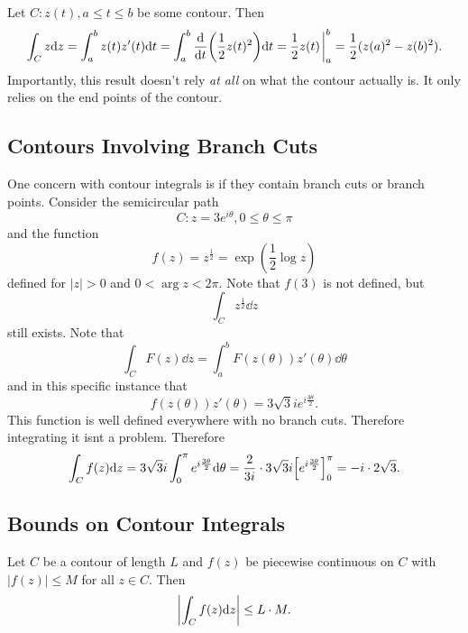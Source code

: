 \documentclass[../notes.tex]{subfiles}
\begin{document}
\begin{example}
    Let $C : z(t), a \leq t \leq b$ be some contour. Then
    \[
        \int_C z \dd z = \int_a^b z(t) z'(t) \dd t =  \int_a^b \dv{t} \qty(\frac{1}{2} z(t)^2) \dd t = \frac{1}{2} z(t) \eval_a^b = \frac{1}{2} (z(a)^2 - z(b)^2)
    .\]
    Importantly, this result doesn't rely \textit{at all} on what the contour actually is. It only relies on the end points of the contour.
\end{example}

\subsection{Contours Involving Branch Cuts}

One concern with contour integrals is if they contain branch cuts or branch points. Consider the semicircular path
\[
    C : z = 3 e^{i \theta}, 0 \leq \theta \leq \pi
\]
and the function
\[
    f(z) = z^{\frac{1}{2}} = \exp(\frac{1}{2} \log z)
\]
defined for $|z| > 0$ and $0 < \arg z < 2 \pi$. Note that $f(3)$ is not defined, but
\[
    \int_C z^{\frac{1}{2}} \dd z
\]
still exists. Note that
\[
    \int_C F(z) \dd z = \int_a^b F(z(\theta)) z'(\theta) \dd \theta
\]
and in this specific instance that
\[
    f(z(\theta)) z'(\theta) = 3 \sqrt{3} i e^{i \frac{3 \theta}{2}}
.\]
This function is well defined everywhere with no branch cuts. Therefore integrating it isnt a problem. Therefore
\[
    \int_C f(z) \dd z = 3 \sqrt{3} i \int_0^\pi e^{i \frac{3 \theta}{2}} \dd \theta = \frac{2}{3i} \cdot 3 \sqrt{3} i \qty[e^{i \frac{3 \theta}{2}}]_0^\pi = - i \cdot 2 \sqrt{3}
.\]

\subsection{Bounds on Contour Integrals}

\begin{theorem}
    Let $C$ be a contour of length $L$ and $f(z)$ be piecewise continuous on $C$ with $|f(z)| \leq M$ for all $z \in C$. Then
    \[
        \qty|\int_C f(z) \dd z| \leq L \cdot M
    .\]
\end{theorem}
\end{document}
